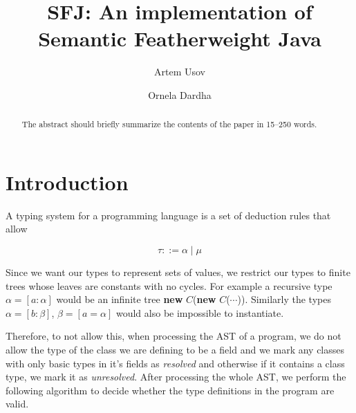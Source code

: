 \documentclass[runningheads]{llncs}
\begin{document}
\title{SFJ: An implementation of Semantic Featherweight Java}

\author{Artem Usov \and Ornela Dardha}



\maketitle

\begin{abstract}
    The abstract should briefly summarize the contents of the paper in 15--250 words.

\end{abstract}


\section{Introduction}

A typing system for a programming language is a set of deduction rules that allow 


\begin{equation}
    \tau ::= \alpha \mid \mu
\end{equation}



Since we want our types to represent sets of values, we restrict our types to finite trees whose 
leaves are constants with no cycles. For example a recursive type $\alpha = [a : \alpha]$ would
be an infinite tree \textbf{new} $C$(\textbf{new} $C$($\cdots{}$)). Similarly the types $\alpha = 
[b: \beta]$, $\beta = [a = \alpha]$ would also be impossible to instantiate. 

Therefore, to not allow this, when processing the AST of a program, we do not allow the type of 
the class we are defining to be a field and we mark any classes with only basic types in it's fields
as \textit{resolved} and otherwise if it contains a class type, we mark it as \textit{unresolved}. 
After processing the whole AST, we perform the following algorithm to decide whether the type 
definitions in the program are valid.
\end{document}
